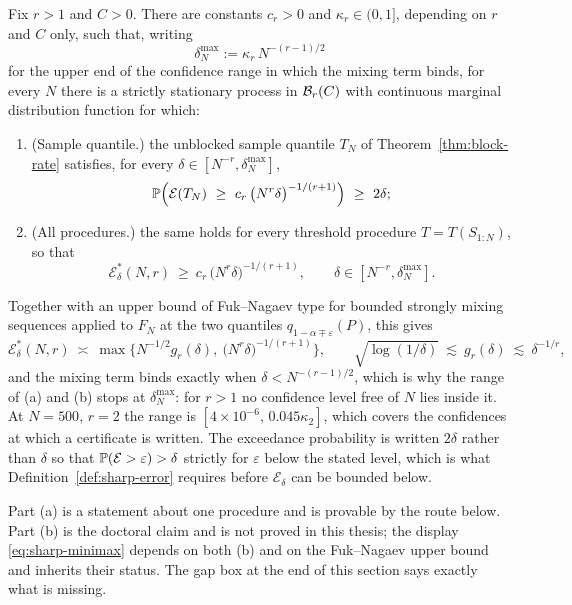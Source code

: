 \documentclass[../../../main.tex]{subfiles}
\begin{document}
\begin{theorem}\label{thm:block-lower}
Fix $r>1$ and $C>0$. There are constants $c_r>0$ and $\kappa_r\in(0,1]$, depending on $r$ and $C$ only, such that, writing
\[
\delta^{\max}_N:=\kappa_r\,N^{-(r-1)/2}
\]
for the upper end of the confidence range in which the mixing term binds, for every $N$ there is a strictly stationary process in $\mathcal B_{r}(C)$ with continuous marginal distribution function for which:
\begin{enumerate}[nosep,label=(\alph*)]
\item (Sample quantile.) the unblocked sample quantile $T_N$ of Theorem~\ref{thm:block-rate} satisfies, for every $\delta\in[N^{-r},\delta^{\max}_N]$,
\[
\Prob\Big(\mathcal E(T_N)\ \ge\ c_r\,\big(N^r\delta\big)^{-1/(r+1)}\Big)\ \ge\ 2\delta;
\]
\item (All procedures.) the same holds for every threshold procedure $T=T(S_{1:N})$, so that
\[
\mathcal E^*_\delta(N,r)\ \ge\ c_r\,\big(N^r\delta\big)^{-1/(r+1)},\qquad \delta\in[N^{-r},\delta^{\max}_N].
\]
\end{enumerate}
Together with an upper bound of Fuk--Nagaev type for bounded strongly mixing sequences applied to $F_N$ at the two quantiles $q_{1-\alpha\mp\varepsilon}(P)$, this gives
\begin{equation}\label{eq:sharp-minimax}
\mathcal E^*_\delta(N,r)\ \asymp\ \max\Big\{N^{-1/2}g_r(\delta),\ \big(N^r\delta\big)^{-1/(r+1)}\Big\},\qquad
\sqrt{\log(1/\delta)}\ \lesssim\ g_r(\delta)\ \lesssim\ \delta^{-1/r},
\end{equation}
and the mixing term binds exactly when $\delta<N^{-(r-1)/2}$, which is why the range of (a) and (b) stops at $\delta^{\max}_N$: for $r>1$ no confidence level free of $N$ lies inside it. At $N=500$, $r=2$ the range is $[4\times10^{-6},\,0.045\kappa_2]$, which covers the confidences at which a certificate is written. The exceedance probability is written $2\delta$ rather than $\delta$ so that $\mathbb{P}(\mathcal E>\varepsilon)>\delta$ strictly for $\varepsilon$ below the stated level, which is what Definition~\ref{def:sharp-error} requires before $\mathcal E_\delta$ can be bounded below.
\end{theorem}

Part (a) is a statement about one procedure and is provable by the route below. Part (b) is the doctoral claim and is not proved in this thesis; the display \eqref{eq:sharp-minimax} depends on both (b) and on the Fuk--Nagaev upper bound and inherits their status. The gap box at the end of this section says exactly what is missing.
\end{document}
